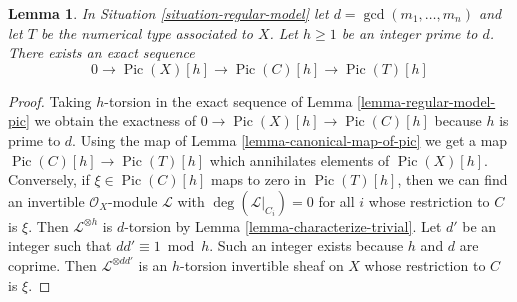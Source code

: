 \documentclass[10pt,a4paper]{amsart}
\theoremstyle{plain}
\newtheorem{lemma}[subsection]{Lemma}
\theoremstyle{definition}
\theoremstyle{remark}
\numberwithin{equation}{subsection}
\def\Pic{\mathop{\mathrm{Pic}}\nolimits}
\begin{document}
\begin{lemma}
\label{lemma-sequence-torsion}
In Situation \ref{situation-regular-model} let $d = \gcd(m_1, \ldots, m_n)$
and let $T$ be the numerical type associated to $X$.
Let $h \geq 1$ be an integer prime to $d$. There exists an exact sequence
$$
0 \to \Pic(X)[h] \to \Pic(C)[h] \to \Pic(T)[h]
$$
\end{lemma}

\begin{proof}
Taking $h$-torsion in the exact sequence of
Lemma \ref{lemma-regular-model-pic}
we obtain the exactness of
$0 \to \Pic(X)[h] \to \Pic(C)[h]$
because $h$ is prime to $d$.
Using the map of Lemma \ref{lemma-canonical-map-of-pic}
we get a map $\Pic(C)[h] \to \Pic(T)[h]$
which annihilates elements of $\Pic(X)[h]$.
Conversely, if $\xi \in \Pic(C)[h]$
maps to zero in $\Pic(T)[h]$, then we can find
an invertible $\mathcal{O}_X$-module $\mathcal{L}$
with $\deg(\mathcal{L}|_{C_i}) = 0$ for all $i$
whose restriction to $C$ is $\xi$.
Then $\mathcal{L}^{\otimes h}$ is $d$-torsion by
Lemma \ref{lemma-characterize-trivial}.
Let $d'$ be an integer such that $dd' \equiv 1 \bmod h$.
Such an integer exists because $h$ and $d$ are coprime.
Then $\mathcal{L}^{\otimes dd'}$ is an $h$-torsion
invertible sheaf on $X$ whose restriction to $C$ is $\xi$.
\end{proof}
\end{document}
